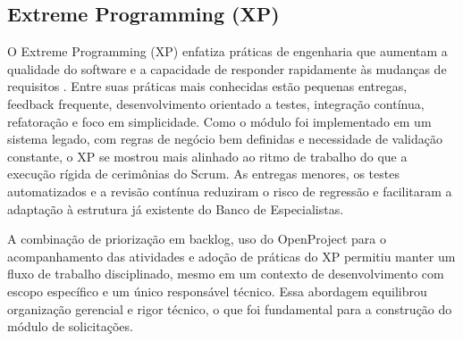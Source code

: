 \subsection{Extreme Programming (XP)}
\label{subsec:extreme-programming-xp}

O Extreme Programming (XP) enfatiza práticas de engenharia que aumentam a qualidade do software
e a capacidade de responder rapidamente às mudanças de requisitos \cite{beck2004extreme}. Entre
suas práticas mais conhecidas estão pequenas entregas, feedback frequente, desenvolvimento
orientado a testes, integração contínua, refatoração e foco em simplicidade. Como o módulo foi
implementado em um sistema legado, com regras de negócio bem definidas e necessidade de
validação constante, o XP se mostrou mais alinhado ao ritmo de trabalho do que a execução
rígida
de cerimônias do Scrum. As entregas menores, os testes automatizados e a revisão contínua
reduziram o risco de regressão e facilitaram a adaptação à estrutura já existente do Banco de
Especialistas.

A combinação de priorização em backlog, uso do OpenProject para o acompanhamento das atividades
e adoção de práticas do XP permitiu manter um fluxo de trabalho disciplinado, mesmo em um
contexto de desenvolvimento com escopo específico e um único responsável técnico. Essa abordagem
equilibrou organização gerencial e rigor técnico, o que foi fundamental para a construção do
módulo de solicitações.

